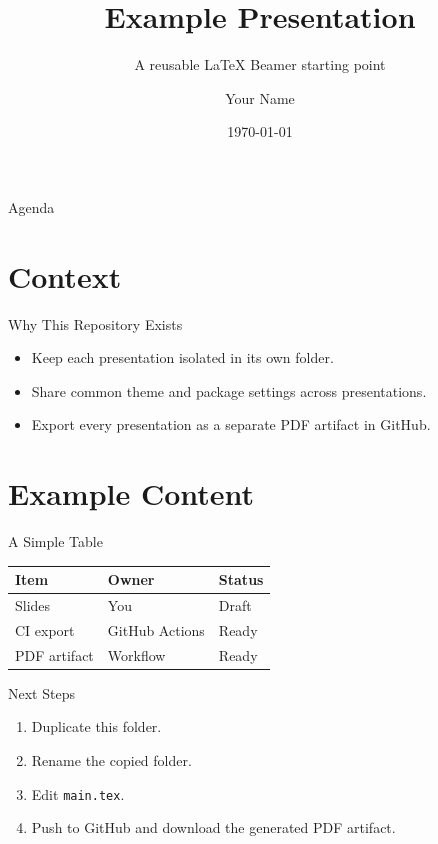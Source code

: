 \documentclass[aspectratio=169]{beamer}
\title{Example Presentation}
\subtitle{A reusable LaTeX Beamer starting point}
\author{Your Name}
\institute{Your Organization}
\date{\today}
\begin{document}
\begin{frame}
  \titlepage
\end{frame}

\begin{frame}{Agenda}
  \tableofcontents
\end{frame}

\section{Context}

\begin{frame}{Why This Repository Exists}
  \begin{itemize}
    \item Keep each presentation isolated in its own folder.
    \item Share common theme and package settings across presentations.
    \item Export every presentation as a separate PDF artifact in GitHub.
  \end{itemize}
\end{frame}

\section{Example Content}

\begin{frame}{A Simple Table}
  \begin{table}
    \centering
    \begin{tabular}{lll}
      \toprule
      Item & Owner & Status \\
      \midrule
      Slides & You & Draft \\
      CI export & GitHub Actions & Ready \\
      PDF artifact & Workflow & Ready \\
      \bottomrule
    \end{tabular}
  \end{table}
\end{frame}

\begin{frame}{Next Steps}
  \begin{enumerate}
    \item Duplicate this folder.
    \item Rename the copied folder.
    \item Edit \texttt{main.tex}.
    \item Push to GitHub and download the generated PDF artifact.
  \end{enumerate}
\end{frame}
\end{document}
